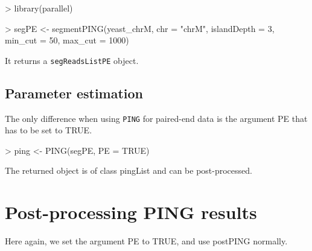 \documentclass[11pt]{article}
\begin{document}
\begin{Schunk}
\begin{Sinput}
> library(parallel)
\end{Sinput}
\end{Schunk}


\begin{Schunk}
\begin{Sinput}
> segPE <- segmentPING(yeast_chrM, chr = "chrM", islandDepth = 3, 
     min_cut = 50, max_cut = 1000)
\end{Sinput}
\end{Schunk}
It returns a \texttt{segReadsListPE} object.


\subsection{Parameter estimation}
The only difference when using \texttt{PING} for paired-end data is the argument PE that has to be set to TRUE.

\begin{Schunk}
\begin{Sinput}
> ping <- PING(segPE, PE = TRUE)
\end{Sinput}
\end{Schunk}
The returned object is of class pingList and can be post-processed.


\section{Post-processing PING results}
Here again, we set the argument PE to TRUE, and use postPING normally.
\end{document}
